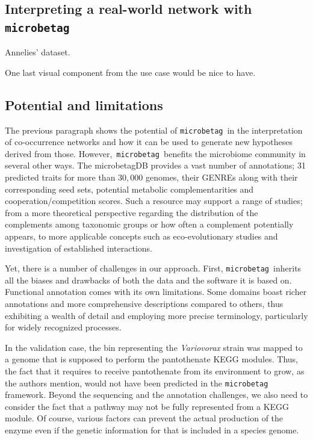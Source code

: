 \documentclass[sn-mathphys,Numbered]{sn-jnl}  %
\theoremstyle{thmstyleone}%
\theoremstyle{thmstyletwo}%
\theoremstyle{thmstylethree}%
\newcommand{\microbetag}{\texttt{microbetag }}
\begin{document}



    \subsection*{Interpreting a real-world network with \microbetag}
        \label{subsec:usecase}


        Annelies' dataset. 

        One last visual component from the use case would be nice to have.  





    \subsection*{Potential and limitations}
    \label{subsec:pot-and-limits}

        The previous paragraph shows the potential of \microbetag in the interpretation of co-occurrence networks and how it can be used to generate new hypotheses derived from those.
        However,~\microbetag benefits the microbiome community in several other ways. 
        The microbetagDB provides a vast number of annotations; 31 predicted traits for more than $30,000$ genomes, their GENREs along with their corresponding seed sets, potential metabolic complementarities and cooperation/competition scores.
        Such a resource may support a range of studies; 
        from a more theoretical perspective regarding the distribution of the complements among taxonomic groups or how often a complement potentially appears, to more applicable concepts such as eco-evolutionary studies and investigation of established interactions.

        Yet, there is a number of challenges in our approach.
        First, \microbetag inherits all the biases and drawbacks of both the data and the software it is based on.
        Functional annotation comes with its own limitations.
        Some domains boast richer annotations and more comprehensive descriptions compared to others, thus exhibiting a wealth of detail and employing more precise terminology, particularly for widely recognized processes.

        In the validation case, the bin representing the \textit{Variovorax} strain was mapped to a genome that is supposed to perform the pantothenate KEGG modules.
        Thus, the fact that it requires to receive pantothenate from its environment to grow, as the authors mention, would not have been predicted in the \microbetag framework. 
        Beyond the sequencing and the annotation challenges, we also need to consider the fact that a pathway may not be fully represented from a KEGG module.
        Of course, various factors can prevent the actual production of the enzyme even if the genetic information for that is included in a species genome.
        
\end{document}
